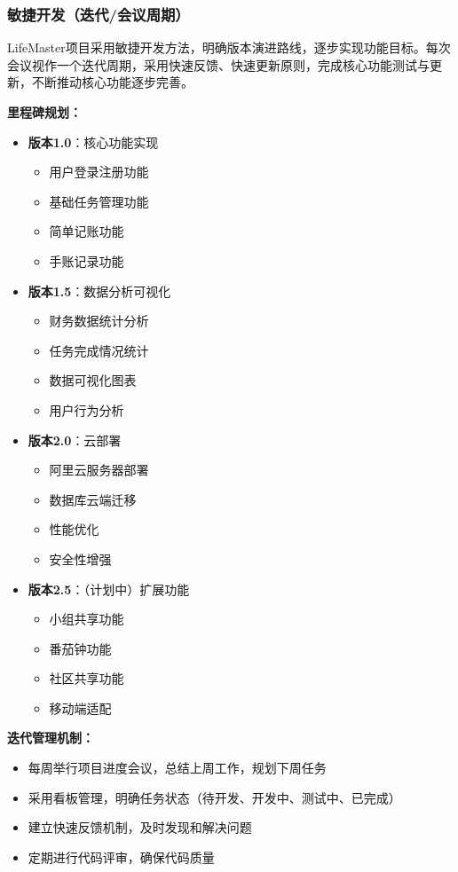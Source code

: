 \documentclass[a4paper]{article}
\begin{document}
\subsubsection{敏捷开发（迭代/会议周期）}

LifeMaster项目采用敏捷开发方法，明确版本演进路线，逐步实现功能目标。每次会议视作一个迭代周期，采用快速反馈、快速更新原则，完成核心功能测试与更新，不断推动核心功能逐步完善。

\textbf{里程碑规划：}
\begin{itemize}
    \item \textbf{版本1.0}：核心功能实现
    \begin{itemize}
        \item 用户登录注册功能
        \item 基础任务管理功能
        \item 简单记账功能
        \item 手账记录功能
    \end{itemize}
    \item \textbf{版本1.5}：数据分析可视化
    \begin{itemize}
        \item 财务数据统计分析
        \item 任务完成情况统计
        \item 数据可视化图表
        \item 用户行为分析
    \end{itemize}
    \item \textbf{版本2.0}：云部署
    \begin{itemize}
        \item 阿里云服务器部署
        \item 数据库云端迁移
        \item 性能优化
        \item 安全性增强
    \end{itemize}
    \item \textbf{版本2.5}：（计划中）扩展功能
    \begin{itemize}
        \item 小组共享功能
        \item 番茄钟功能
        \item 社区共享功能
        \item 移动端适配
    \end{itemize}
\end{itemize}

\textbf{迭代管理机制：}
\begin{itemize}
    \item 每周举行项目进度会议，总结上周工作，规划下周任务
    \item 采用看板管理，明确任务状态（待开发、开发中、测试中、已完成）
    \item 建立快速反馈机制，及时发现和解决问题
    \item 定期进行代码评审，确保代码质量
\end{itemize}
\end{document}

